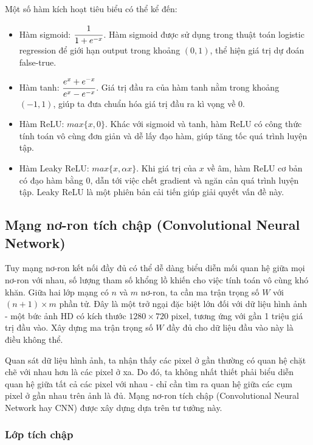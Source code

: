 \documentclass[12pt]{extreport}
\begin{document}
Một số hàm kích hoạt tiêu biểu có thể kể đến:
\begin{itemize}
    \item Hàm sigmoid: $ \cfrac{1}{1 + e^{-x}} $. Hàm sigmoid được sử dụng trong thuật toán logistic regression để giới hạn output trong khoảng $ (0, 1) $, thể hiện giá trị dự đoán false-true.
    \item Hàm tanh: $ \cfrac{e^{x} + e^{-x}}{e^{x} - e^{-x}} $. Giá trị đầu ra của hàm tanh nằm trong khoảng $ (-1, 1) $, giúp ta đưa chuẩn hóa giá trị đầu ra kì vọng về 0.
    \item Hàm ReLU: $ max\{x, 0\} $. Khác với sigmoid và tanh, hàm ReLU có công thức tính toán vô cùng đơn giản và dễ lấy đạo hàm, giúp tăng tốc quá trình luyện tập.
    \item Hàm Leaky ReLU: $ max\{x, \alpha x\} $. Khi giá trị của $ x $ về âm, hàm ReLU cơ bản có đạo hàm bằng 0, dẫn tới việc chết gradient và ngăn cản quá trình luyện tập. Leaky ReLU là một phiên bản cải tiến giúp giải quyết vấn đề này.
\end{itemize}

\subsection{Mạng nơ-ron tích chập (Convolutional Neural Network)}

Tuy mạng nơ-ron kết nối đầy đủ có thể dễ dàng biểu diễn mối quan hệ giữa mọi nơ-ron với nhau, số lượng tham số khổng lồ khiến cho việc tính toán vô cùng khó khăn. Giữa hai lớp mạng có $ n $ và $ m $ nơ-ron, ta cần ma trận trọng số $ W $ với $ (n + 1) \times m $ phần tử. Đây là một trở ngại đặc biệt lớn đối với dữ liệu hình ảnh - một bức ảnh HD có kích thước $ 1280 \times 720 $ pixel, tương ứng với gần 1 triệu giá trị đầu vào. Xây dựng ma trận trọng số $ W $ đầy đủ cho dữ liệu đầu vào này là điều không thể.

Quan sát dữ liệu hình ảnh, ta nhận thấy các pixel ở gần thường có quan hệ chặt chẽ với nhau hơn là các pixel ở xa. Do đó, ta không nhất thiết phải biểu diễn quan hệ giữa tất cả các pixel với nhau - chỉ cần tìm ra quan hệ giữa các cụm pixel ở gần nhau trên ảnh là đủ. Mạng nơ-ron tích chập (Convolutional Neural Network hay CNN) được xây dựng dựa trên tư tưởng này.

\subsubsection{Lớp tích chập}
\label{convolutional-layer}
\end{document}
